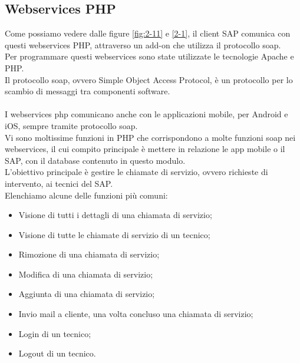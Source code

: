 \subsection{Webservices PHP}
Come possiamo vedere dalle figure \ref{fig:2-11} e \ref{2-1}, il client SAP comunica con questi webservices PHP, attraverso un add-on che utilizza il protocollo \gls{soap}.\\
Per programmare questi webservices sono state utilizzate le tecnologie Apache e PHP.\\ 
Il protocollo \gls{soap}, ovvero Simple Object Access Protocol, è un protocollo per lo scambio di messaggi tra componenti software.\\\\
I webservices php comunicano anche con le applicazioni mobile, per Android e iOS, sempre tramite protocollo \gls{soap}.\\
Vi sono moltissime funzioni in PHP che corrispondono a molte funzioni \gls{soap} nei webservices, il cui compito principale è mettere in relazione le app mobile o il SAP, con il database contenuto in questo modulo.\\
L'obiettivo principale è gestire le chiamate di servizio, ovvero richieste di intervento, ai tecnici del SAP.\\
Elenchiamo alcune delle funzioni più comuni:
\begin{itemize}
	\item Visione di tutti i dettagli di una chiamata di servizio;
	\item Visione di tutte le chiamate di servizio di un tecnico;
	\item Rimozione di una chiamata di servizio;
	\item Modifica di una chiamata di servizio;
	\item Aggiunta di una chiamata di servizio;
	\item Invio mail a cliente, una volta concluso una chiamata di servizio;
	\item Login di un tecnico;
	\item Logout di un tecnico.
\end{itemize}
\newpage
